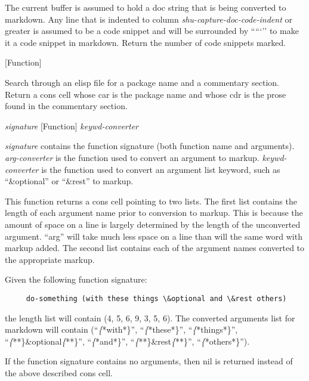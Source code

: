 \begin{doc-string}
The current buffer is assumed to hold a doc string that is being converted to
markdown.  Any line that is indented to column \emph{shu-capture-doc-code-indent} or
greater is assumed to be a code snippet and will be surrounded by `````'' to make
it a code snippet in markdown.  Return the number of code snippets marked.
\end{doc-string}

\vspace{1em}
\noindent
{}
\usebox{\funcname}
 \hfill [Function]

\begin{doc-string}
Search through an elisp file for a package name and a commentary section.
Return a cons cell whose car is the package name and whose cdr is the prose
found in the commentary section.
\end{doc-string}

\vspace{1em}
\noindent
{}
\usebox{\funcname}\emph{signature}
 \hfill [Function]
\hspace*{\wd\funcname}\emph{keywd-converter}

\begin{doc-string}
\emph{signature} contains the function signature (both function name and arguments).
\emph{arg-converter} is the function used to convert an argument to markup.  \emph{keywd-converter}
is the function used to convert an argument list keyword, such as ``\&optional'' or ``\&rest''
to markup.

This function returns a cons cell pointing to two lists.  The first list contains the length
of each argument name prior to conversion to markup.  This is because the amount of space
on a line is largely determined by the length of the unconverted argument.  ``arg'' will
take much less space on a line than will the same word with markup added.  The second list
contains each of the argument names converted to the appropriate markup.

Given the following function signature:

\small{\begin{verbatim}
     do-something (with these things \&optional and \&rest others)
\end{verbatim}}

the length list will contain (4, 5, 6, 9, 3, 5, 6).  The converted arguments list for
markdown will contain (``\emph\{*with*\}'', ``\emph\{*these*\}'', ``\emph\{*things*\}'', ``\emph\{**\}\&optional\emph\{**\}'', ``\emph\{*and*\}'',
``\emph\{**\}\&rest\emph\{**\}'', ``\emph\{*others*\}'').

If the function signature contains no arguments, then nil is returned instead of the
above described cons cell.
\end{doc-string}

